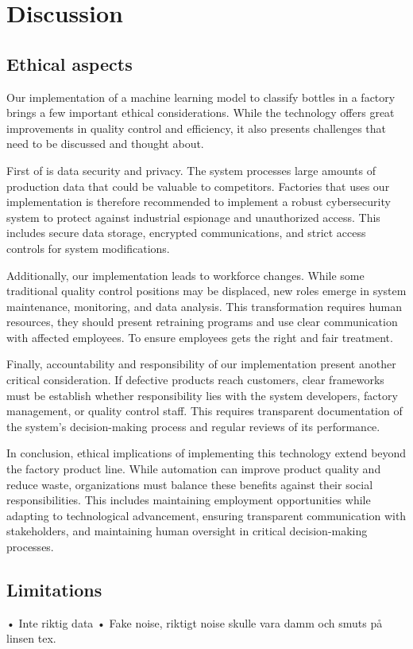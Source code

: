 \section{Discussion}

\subsection{Ethical aspects}

Our implementation of a machine learning model to classify bottles in a factory brings a few important ethical considerations. 
While the technology offers great improvements in quality control and efficiency, it also presents challenges that need to be discussed and thought about.

First of is data security and privacy. 
The system processes large amounts of production data that could be valuable to competitors. 
Factories that uses our implementation is therefore recommended to implement a robust cybersecurity system to protect against industrial espionage and unauthorized access. 
This includes secure data storage, encrypted communications, and strict access controls for system modifications.

Additionally, our implementation leads to workforce changes. While some traditional quality control positions may be displaced, new roles emerge in system maintenance, monitoring, and data analysis. 
This transformation requires human resources, they should present retraining programs and use clear communication with affected employees.
To ensure employees gets the right and fair treatment.

Finally, accountability and responsibility of our implementation present another critical consideration. 
If defective products reach customers, clear frameworks must be establish whether responsibility lies with the system developers, factory management, or quality control staff. 
This requires transparent documentation of the system's decision-making process and regular reviews of its performance.

In conclusion, ethical implications of implementing this technology extend beyond the factory product line.
While automation can improve product quality and reduce waste, organizations must balance these benefits against their social responsibilities. 
This includes maintaining employment opportunities while adapting to technological advancement, ensuring transparent communication with stakeholders, and maintaining human oversight in critical decision-making processes.

\subsection{Limitations}

• Inte riktig data
• Fake noise, riktigt noise skulle vara damm och smuts på linsen tex.